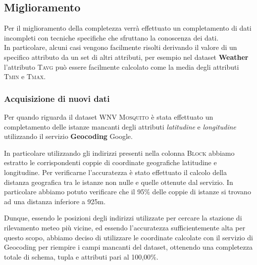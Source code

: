 \subsection{Miglioramento}

Per il miglioramento della completezza verrà effettuato un completamento di dati incompleti con tecniche specifiche che sfruttano la conoscenza dei dati.\\
In particolare, alcuni casi vengono facilmente risolti derivando il valore di un specifico attributo da un set di altri attributi, per esempio nel dataset \textbf{Weather} l'attributo \textsc{Tavg} può essere facilmente calcolato come la media degli attributi \textsc{Tmin} e \textsc{Tmax}.


\subsubsection{Acquisizione di nuovi dati}
Per quando riguarda il dataset \textsc{WNV Mosquito} è stata effettuato un completamento delle istanze mancanti degli attributi \textit{latitudine} e \textit{longitudine} utilizzando il servizio \textbf{Geocoding} Google.

In particolare utilizzando gli indirizzi presenti nella colonna \textsc{Block} abbiamo estratto le corrispondenti coppie di coordinate geografiche latitudine e longitudine. 
Per verificarne l'accuratezza è stato effettuato il calcolo della distanza geografica tra le istanze non nulle e quelle ottenute dal servizio. In particolare abbiamo potuto verificare che il 95\% delle coppie di istanze si trovano ad una distanza inferiore a 925m.

Dunque, essendo le posizioni degli indirizzi utilizzate per cercare la stazione di rilevamento meteo più vicine, ed essendo l'accuratezza sufficientemente alta per questo scopo, abbiamo deciso di utilizzare le coordinate calcolate con il servizio di Geocoding per riempire i campi mancanti del dataset, ottenendo una completezza totale di schema, tupla e attributi pari al 100,00\%.
